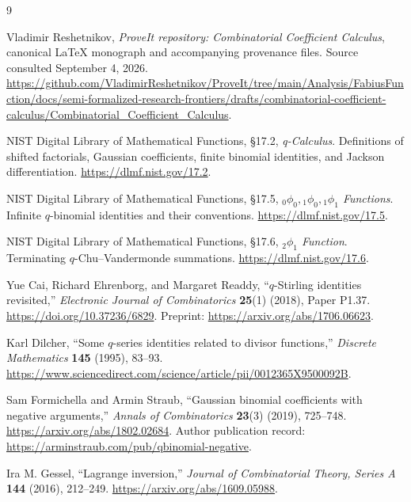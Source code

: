 \documentclass[11pt,a4paper,oneside,openany]{book}
\theoremstyle{definition}
\theoremstyle{remark}
\begin{document}
\backmatter
\begin{thebibliography}{9}

Vladimir Reshetnikov, \emph{ProveIt repository: Combinatorial Coefficient
Calculus}, canonical \LaTeX{} monograph and accompanying provenance files.
Source consulted September 4, 2026.
\url{https://github.com/VladimirReshetnikov/ProveIt/tree/main/Analysis/FabiusFunction/docs/semi-formalized-research-frontiers/drafts/combinatorial-coefficient-calculus/Combinatorial_Coefficient_Calculus}.

NIST Digital Library of Mathematical Functions, \S17.2,
\emph{q-Calculus}. Definitions of shifted factorials, Gaussian coefficients,
finite binomial identities, and Jackson differentiation.
\url{https://dlmf.nist.gov/17.2}.

NIST Digital Library of Mathematical Functions, \S17.5,
\emph{\({}_0\phi_0,{}_1\phi_0,{}_1\phi_1\) Functions}.
Infinite \(q\)-binomial identities and their conventions.
\url{https://dlmf.nist.gov/17.5}.

NIST Digital Library of Mathematical Functions, \S17.6,
\emph{\({}_2\phi_1\) Function}. Terminating \(q\)-Chu--Vandermonde
summations.
\url{https://dlmf.nist.gov/17.6}.

Yue Cai, Richard Ehrenborg, and Margaret Readdy,
``\(q\)-Stirling identities revisited,''
\emph{Electronic Journal of Combinatorics} \textbf{25}(1) (2018), Paper P1.37.
\url{https://doi.org/10.37236/6829}.
Preprint: \url{https://arxiv.org/abs/1706.06623}.

Karl Dilcher, ``Some \(q\)-series identities related to divisor functions,''
\emph{Discrete Mathematics} \textbf{145} (1995), 83--93.
\url{https://www.sciencedirect.com/science/article/pii/0012365X9500092B}.

Sam Formichella and Armin Straub,
``Gaussian binomial coefficients with negative arguments,''
\emph{Annals of Combinatorics} \textbf{23}(3) (2019), 725--748.
\url{https://arxiv.org/abs/1802.02684}.
Author publication record:
\url{https://arminstraub.com/pub/qbinomial-negative}.

Ira M. Gessel, ``Lagrange inversion,''
\emph{Journal of Combinatorial Theory, Series A} \textbf{144} (2016), 212--249.
\url{https://arxiv.org/abs/1609.05988}.

\end{thebibliography}
\end{document}
